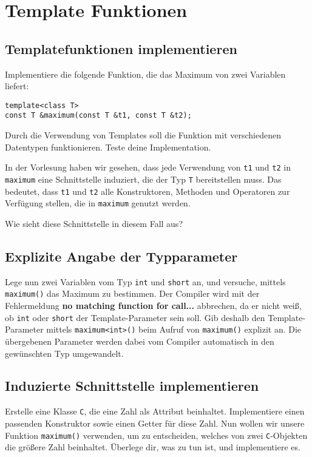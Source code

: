 \section{Template Funktionen}
\subsection{Templatefunktionen implementieren}
Implementiere die folgende Funktion, die das Maximum von zwei Variablen liefert:

\begin{lstlisting}
template<class T>
const T &maximum(const T &t1, const T &t2);
\end{lstlisting}

Durch die Verwendung von Templates soll die Funktion mit verschiedenen Datentypen funktionieren.
Teste deine Implementation.

In der Vorlesung haben wir gesehen, dass jede Verwendung von \texttt{t1} und \texttt{t2} in \texttt{maximum} eine Schnittstelle induziert, die der Typ \texttt{T} bereitstellen muss.
Das bedeutet, dass \texttt{t1} und \texttt{t2} alle Konstruktoren, Methoden und Operatoren zur Verfügung stellen, die in \texttt{maximum} genutzt werden.

Wie sieht diese Schnittstelle in diesem Fall aus?

\subsection{Explizite Angabe der Typparameter}
Lege nun zwei Variablen vom Typ \texttt{int} und \texttt{short} an, und versuche, mittels \texttt{maximum()} das Maximum zu bestimmen.
Der Compiler wird mit der Fehlermeldung \textbf{no matching function for call...} abbrechen, da er nicht weiß, ob \texttt{int} oder \texttt{short} der Template-Parameter sein soll.
Gib deshalb den Template-Parameter mittels \texttt{maximum<int>()} beim Aufruf von \texttt{maximum()} explizit an.
Die übergebenen Parameter werden dabei vom Compiler automatisch in den gewünschten Typ umgewandelt.

\subsection{Induzierte Schnittstelle implementieren}
Erstelle eine Klasse \texttt{C}, die eine Zahl als Attribut beinhaltet. Implementiere einen passenden Konstruktor sowie einen Getter für diese Zahl. Nun wollen wir unsere Funktion  \texttt{maximum()} verwenden, um zu entscheiden, welches von zwei \texttt{C}-Objekten die größere Zahl beinhaltet.
Überlege dir, was zu tun ist, und implementiere es.

